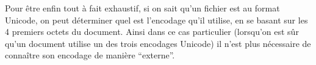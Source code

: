 Pour être enfin tout à fait exhaustif, si on sait qu'un fichier est au
format Unicode, on peut déterminer quel est l'encodage qu'il utilise, en
se basant sur les 4 premiers octets du document. Ainsi dans ce cas
particulier (lorsqu'on est sûr qu'un document utilise un des trois
encodages Unicode) il n'est plus nécessaire de connaître son encodage de
manière ``externe''.


    
    
    
